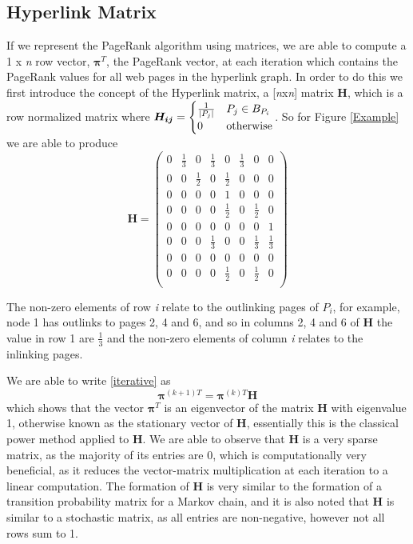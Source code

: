 \documentclass[11pt]{report}
\begin{document}
\subsection{Hyperlink Matrix}
If we represent the PageRank algorithm using matrices, we are able to compute a 1 x \textit{n} row vector, $\boldsymbol{\pi}^T$, the PageRank vector, at each iteration which contains the PageRank values for all web pages in the hyperlink graph. In order to do this we first introduce the concept of the Hyperlink matrix, a [\textit{n}x\textit{n}] matrix \textbf{H}, which is a row normalized matrix where 
\(\boldsymbol{H_{ij}} = \begin{cases} \frac{1}{\vert P_j \vert} & P_j\in B_{P_i } \\ 0 & \textnormal{otherwise} \end{cases}\). So for Figure \ref{Example} we are able to produce 
\[\textbf{H}=\left(
\begin{array}{cccccccc}
0 & \frac{1}{3} & 0 & \frac{1}{3} & 0 &\frac{1}{3} & 0& 0 \\
0 & 0 &\frac{1}{2}& 0 &\frac{1}{2}& 0 & 0 & 0\\
0 & 0 & 0 & 0 & 1 & 0 & 0 & 0\\
0 & 0 & 0 & 0 & \frac{1}{2} & 0 & \frac{1}{2} & 0\\
0 & 0 & 0 & 0 & 0 & 0 & 0 & 1\\
0 & 0 & 0 & \frac{1}{3} & 0 & 0 & \frac{1}{3} & \frac{1}{3} \\
0 & 0 & 0 & 0 & 0 & 0 & 0 & 0\\
0 & 0 & 0 & 0 & \frac{1}{2} & 0 & \frac{1}{2} & 0\\
\end{array}
\right)	\]

The non-zero elements of row \textit{i} relate to the outlinking pages of $P_i$, for example, node 1 has outlinks to pages 2, 4 and 6, and so in columns 2, 4 and 6 of \textbf{H} the value in row 1 are $\frac{1}{3}$ and the non-zero elements of column \textit{i} relates to the inlinking pages.

We are able to write \eqref{iterative} as \begin{equation}
\boldsymbol\pi^{(k+1)T} = \boldsymbol\pi^{(k)T}\textbf{H}
\end{equation} which shows that the vector $\boldsymbol\pi^T$ is an eigenvector of the matrix \textbf{H} with eigenvalue 1, otherwise known as the stationary vector of \textbf{H}, essentially this is the classical power method applied to \textbf{H}. We are able to observe that \textbf{H} is a very sparse matrix, as the majority of its entries are 0, which is computationally very beneficial, as it reduces the vector-matrix multiplication at each iteration to a linear computation. The formation of \textbf{H} is very similar to the formation of a transition probability matrix for a Markov chain, and it is also noted that \textbf{H} is similar to a stochastic matrix, as all entries are non-negative, however not all rows sum to 1.
\end{document}
